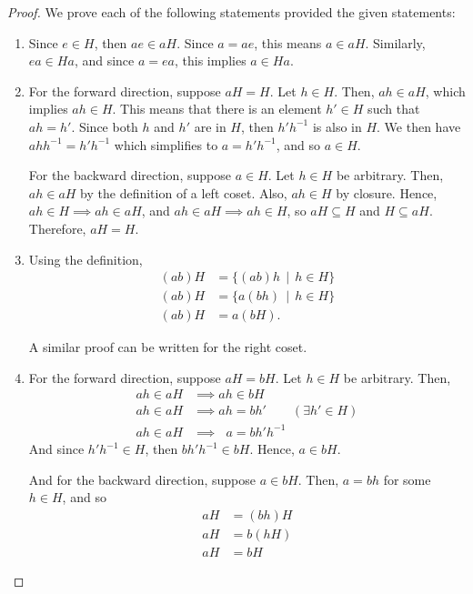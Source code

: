     \begin{proof}
        We prove each of the following statements provided the given statements:
        \begin{enumerate}
            \item Since \(e \in H\), then \(ae \in aH\). Since \(a = ae\), this means \(a\in aH\). Similarly, \(ea\in Ha\), and since \(a = ea\), this implies \(a \in Ha\).

            \item For the forward direction, suppose \(aH = H\). Let \(h\in H\). Then, \(ah \in aH\), which implies \(ah \in H\). This means that there is an element \(h'\in H\) such that \(ah = h'\). Since both \(h\) and \(h'\) are in \(H\), then \(h'h^{-1}\) is also in \(H\). We then have \(ahh^{-1} = h'h^{-1}\) which simplifies to \(a = h'h^{-1}\), and so \(a\in H\).

            For the backward direction, suppose \(a\in H\). Let \(h\in H\) be arbitrary. Then, \(ah \in aH\) by the definition of a left coset. Also, \(ah \in H\) by closure. Hence, \(ah \in H \implies ah\in aH\), and \(ah\in aH \implies ah\in H\), so \(aH \subseteq H\) and \(H \subseteq aH\). Therefore, \(aH = H\).

            \item Using the definition,
            \begin{align*}
                (ab)H &= \{(ab)h \,\mid\, h\in H\} \\
                (ab)H &= \{a(bh) \,\mid\, h\in H\} \\
                (ab)H &= a(bH).
            \end{align*}

            A similar proof can be written for the right coset.

            \item For the forward direction, suppose \(aH = bH\). Let \(h\in H\) be arbitrary. Then,
            \begin{align*}
                ah\in aH &\implies ah\in bH \\
                ah\in aH &\implies ah = bh' \qquad (\exists h'\in H) \\
                ah\in aH &\implies \phantom{h}a = bh'h^{-1}
            \end{align*}
            And since \(h'h^{-1} \in H\), then \(bh'h^{-1} \in bH\). Hence, \(a \in bH\).

            And for the backward direction, suppose \(a\in bH\). Then, \(a = bh\) for some \(h\in H\), and so
            \begin{align*}
                aH &= (bh)H \\
                aH &= b(hH) \\
                aH &= bH
            \end{align*}


\end{enumerate}
\end{proof}
